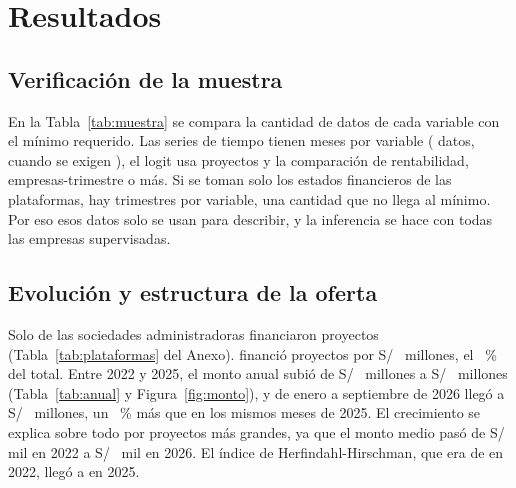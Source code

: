 \section{Resultados}

\subsection{Verificación de la muestra}

En la Tabla~\ref{tab:muestra} se compara la cantidad de datos de cada variable con el mínimo requerido. Las series de tiempo tienen  meses por variable ( datos, cuando se exigen ), el logit usa  proyectos y la comparación de rentabilidad,  empresas-trimestre o más. Si se toman solo los estados financieros de las plataformas, hay  trimestres por variable, una cantidad que no llega al mínimo. Por eso esos datos solo se usan para describir, y la inferencia se hace con todas las empresas supervisadas.

\begin{table}[!t]
\caption{Comprobación del tamaño de la muestra de cada variable}
\label{tab:muestra}
\small

\end{table}


\subsection{Evolución y estructura de la oferta}

Solo  de las  sociedades administradoras financiaron proyectos (Tabla~\ref{tab:plataformas} del Anexo).  financió  proyectos por S/~ millones, el ~\% del total. Entre 2022 y 2025, el monto anual subió de S/~ millones a S/~ millones (Tabla~\ref{tab:anual} y Figura~\ref{fig:monto}), y de enero a septiembre de 2026 llegó a S/~ millones, un ~\% más que en los mismos meses de 2025. El crecimiento se explica sobre todo por proyectos más grandes, ya que el monto medio pasó de S/~ mil en 2022 a S/~ mil en 2026. El índice de Herfindahl-Hirschman, que era de  en 2022, llegó a  en 2025.


